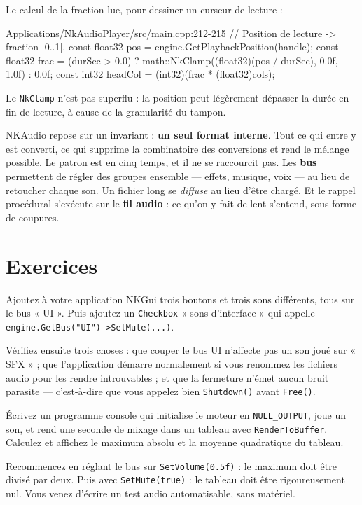 Le calcul de la fraction lue, pour dessiner un curseur de lecture :

\begin{nkcode}{Applications/NkAudioPlayer/src/main.cpp:212-215}
        // Position de lecture -> fraction [0..1].
        const float32 pos = engine.GetPlaybackPosition(handle);
        const float32 frac = (durSec > 0.0) ? math::NkClamp((float32)(pos / durSec), 0.0f, 1.0f) : 0.0f;
        const int32 headCol = (int32)(frac * (float32)cols);
\end{nkcode}

Le \texttt{NkClamp} n'est pas superflu : la position peut légèrement dépasser la
durée en fin de lecture, à cause de la granularité du tampon.

\begin{nkbilan}
NKAudio repose sur un invariant : \textbf{un seul format interne}. Tout ce qui
entre y est converti, ce qui supprime la combinatoire des conversions et rend le
mélange possible. Le patron est en cinq temps, et il ne se raccourcit pas. Les
\textbf{bus} permettent de régler des groupes ensemble --- effets, musique, voix
--- au lieu de retoucher chaque son. Un fichier long se \emph{diffuse} au lieu
d'être chargé. Et le rappel procédural s'exécute sur le \textbf{fil audio} : ce
qu'on y fait de lent s'entend, sous forme de coupures.
\end{nkbilan}

\section{Exercices}

\begin{nkpratique}
Ajoutez à votre application NKGui trois boutons et trois sons différents, tous
sur le bus « UI ». Puis ajoutez un \texttt{Checkbox} « sons d'interface » qui
appelle \texttt{engine.GetBus("UI")->SetMute(...)}.

Vérifiez ensuite trois choses : que couper le bus UI n'affecte pas un son joué
sur « SFX » ; que l'application démarre normalement si vous renommez les fichiers
audio pour les rendre introuvables ; et que la fermeture n'émet aucun bruit
parasite — c'est-à-dire que vous appelez bien \texttt{Shutdown()} avant
\texttt{Free()}.
\end{nkpratique}

\begin{nkdemo}
Écrivez un programme console qui initialise le moteur en \texttt{NULL\_OUTPUT},
joue un son, et rend une seconde de mixage dans un tableau avec
\texttt{RenderToBuffer}. Calculez et affichez le maximum absolu et la moyenne
quadratique du tableau.

Recommencez en réglant le bus sur \texttt{SetVolume(0.5f)} : le maximum doit être
divisé par deux. Puis avec \texttt{SetMute(true)} : le tableau doit être
rigoureusement nul. Vous venez d'écrire un test audio automatisable, sans
matériel.
\end{nkdemo}


